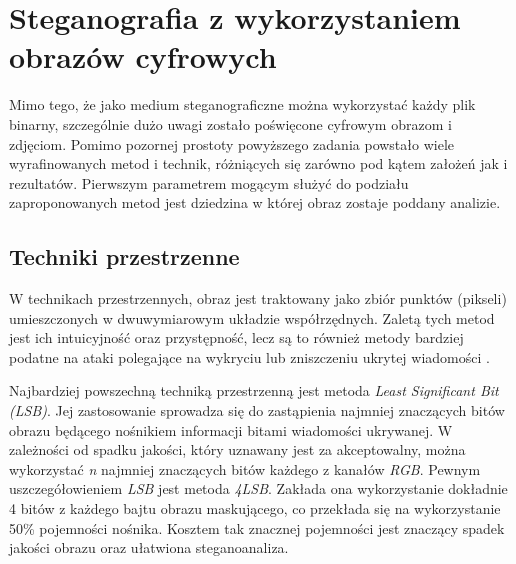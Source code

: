 {    \section{Steganografia z wykorzystaniem obrazów cyfrowych}
    {
        Mimo tego, że jako medium steganograficzne można wykorzystać każdy plik binarny, szczególnie dużo uwagi zostało
        poświęcone cyfrowym obrazom i zdjęciom. Pomimo pozornej prostoty powyższego zadania powstało wiele
        wyrafinowanych metod i technik, różniących się zarówno pod kątem założeń jak i rezultatów. Pierwszym parametrem
        mogącym służyć do podziału zaproponowanych metod jest dziedzina w której  obraz zostaje poddany analizie.

        \subsection{Techniki przestrzenne}
        {
            W technikach przestrzennych, obraz jest traktowany jako zbiór punktów (pikseli) umieszczonych w
            dwuwymiarowym układzie współrzędnych. Zaletą tych metod jest ich intuicyjność oraz przystępność, lecz są to
            również metody bardziej podatne na ataki polegające na wykryciu lub zniszczeniu ukrytej
            wiadomości \cite{Sharma2020AnIS}.

            Najbardziej powszechną techniką przestrzenną jest metoda \textit{Least Significant Bit
            \textnormal{(}LSB\textnormal{)}}. Jej zastosowanie  sprowadza się do zastąpienia najmniej znaczących bitów
            obrazu będącego nośnikiem informacji bitami wiadomości  ukrywanej. W zależności od spadku jakości, który
            uznawany jest za akceptowalny, można wykorzystać \textit{n} najmniej znaczących bitów każdego z kanałów
            \textit{RGB}. Pewnym uszczegółowieniem \textit{LSB} jest metoda \textit{4LSB}. Zakłada ona wykorzystanie
            dokładnie 4 bitów z każdego bajtu obrazu maskującego, co przekłada się  na wykorzystanie 50\% pojemności
            nośnika. Kosztem tak znacznej pojemności jest znaczący spadek jakości obrazu  oraz ułatwiona steganoanaliza.

}}}
